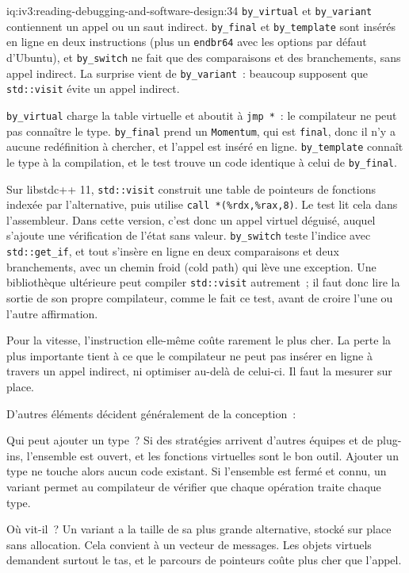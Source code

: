 \begin{solution}{iq:iv3:reading-debugging-and-software-design:34}
\texttt{by\_virtual} et \texttt{by\_variant} contiennent un appel ou un saut indirect. \texttt{by\_final} et \texttt{by\_template} sont insérés en ligne en deux instructions (plus un \texttt{endbr64} avec les options par défaut d'Ubuntu), et \texttt{by\_switch} ne fait que des comparaisons et des branchements, sans appel indirect. La surprise vient de \texttt{by\_variant}~: beaucoup supposent que \texttt{std::visit} évite un appel indirect.

\texttt{by\_virtual} charge la table virtuelle et aboutit à \texttt{jmp *}~: le compilateur ne peut pas connaître le type. \texttt{by\_final} prend un \texttt{Momentum}, qui est \texttt{final}, donc il n'y a aucune redéfinition à chercher, et l'appel est inséré en ligne. \texttt{by\_template} connaît le type à la compilation, et le test trouve un code identique à celui de \texttt{by\_final}.

Sur libstdc++ 11, \texttt{std::visit} construit une table de pointeurs de fonctions indexée par l'alternative, puis utilise \texttt{call *(\%rdx,\%rax,8)}. Le test lit cela dans l'assembleur. Dans cette version, c'est donc un appel virtuel déguisé, auquel s'ajoute une vérification de l'état sans valeur. \texttt{by\_switch} teste l'indice avec \texttt{std::get\_if}, et tout s'insère en ligne en deux comparaisons et deux branchements, avec un chemin froid (cold path) qui lève une exception. Une bibliothèque ultérieure peut compiler \texttt{std::visit} autrement~; il faut donc lire la sortie de son propre compilateur, comme le fait ce test, avant de croire l'une ou l'autre affirmation.

Pour la vitesse, l'instruction elle-même coûte rarement le plus cher. La perte la plus importante tient à ce que le compilateur ne peut pas insérer en ligne à travers un appel indirect, ni optimiser au-delà de celui-ci. Il faut la mesurer sur place.

D'autres éléments décident généralement de la conception~:

Qui peut ajouter un type~? Si des stratégies arrivent d'autres équipes et de plug-ins, l'ensemble est ouvert, et les fonctions virtuelles sont le bon outil. Ajouter un type ne touche alors aucun code existant. Si l'ensemble est fermé et connu, un variant permet au compilateur de vérifier que chaque opération traite chaque type.

Où vit-il~? Un variant a la taille de sa plus grande alternative, stocké sur place sans allocation. Cela convient à un vecteur de messages. Les objets virtuels demandent surtout le tas, et le parcours de pointeurs coûte plus cher que l'appel.


\end{solution}
